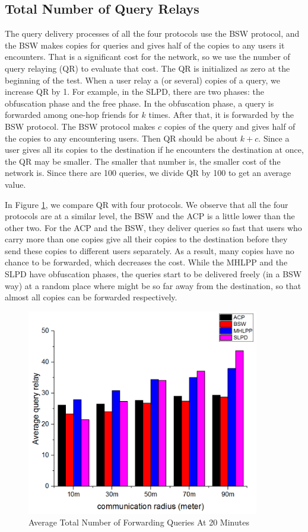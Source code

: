 \subsection{ Total Number of Query Relays}

\noindent The query delivery processes of all the four protocols use the BSW protocol, and the BSW makes copies for queries and gives half of the copies to any users it encounters. That is a significant cost for the network, so we use the number of query relaying (QR) to evaluate that cost. The QR is initialized as zero at the beginning of the test. When a user relay a (or several) copies of a query, we increase QR by 1. For example, in the SLPD, there are two phases: the obfuscation phase and the free phase. In the obfuscation phase, a query is forwarded among one-hop friends for $k$ times. After that, it is forwarded by the BSW protocol. The BSW protocol makes $c$ copies of the query and gives half of the copies to any encountering users. Then QR should be about $k+c$. Since a user gives all its copies to the destination if he encounters the destination at once, the QR may be smaller. The smaller that number is, the smaller cost of the network is. Since there are 100 queries, we divide QR by 100 to get an average value. 

In Figure \ref{fig:F418AverageTotalNumberofForwardingQueriesAt20Minutes}, we compare QR with four protocols. We observe that all the four protocols are at a similar level, the BSW and the ACP is a little lower than the other two. For the ACP and the BSW, they deliver queries so fast that users who carry more than one copies give all their copies to the destination before they send these copies to different users separately. As a result, many copies have no chance to be forwarded, which decreases the cost. While the MHLPP and the SLPD have obfuscation phases, the queries start to be delivered freely (in a BSW way) at a random place where might be so far away from the destination, so that almost all copies can be forwarded respectively.

\begin{figure} [hbtp]
  \centering 
  \includegraphics[width=4.0in]{figures/F418AverageTotalNumberofForwardingQueriesAt20Minutes.png}
  \caption{Average Total Number of Forwarding Queries At 20 Minutes} 
  \label{fig:F418AverageTotalNumberofForwardingQueriesAt20Minutes} %
\end{figure}

